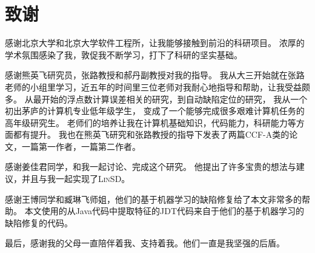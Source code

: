 \chapter{致谢}

感谢北京大学和北京大学软件工程所，让我能够接触到前沿的科研项目。
浓厚的学术氛围感染了我，敦促我不断学习，打下了科研的坚实基础。

感谢熊英飞研究员，张路教授和郝丹副教授对我的指导。
我从大三开始就在张路老师的小组里学习，近五年的时间里三位老师对我耐心地指导和帮助，让我受益颇多。
从最开始的浮点数计算误差相关的研究，到自动缺陷定位的研究，
我从一个初出茅庐的计算机专业低年级学生，
变成了一个能够完成很多艰难计算机任务的高年级研究生。
老师们的培养让我在计算机基础知识，代码能力，科研能力等方面都有提升。
我也在熊英飞研究和张路教授的指导下发表了两篇CCF-A类的论文，一篇第一作者，一篇第二作者。

感谢姜佳君同学，和我一起讨论、完成这个研究。
他提出了许多宝贵的想法与建议，并且与我一起实现了\textsc{LinSD}。

感谢王博同学和臧琳飞师姐，他们的基于机器学习的缺陷修复给了本文非常多的帮助。
本文使用的从Java代码中提取特征的JDT代码来自于他们的基于机器学习的缺陷修复的代码。

最后，感谢我的父母一直陪伴着我、支持着我。他们一直是我坚强的后盾。
